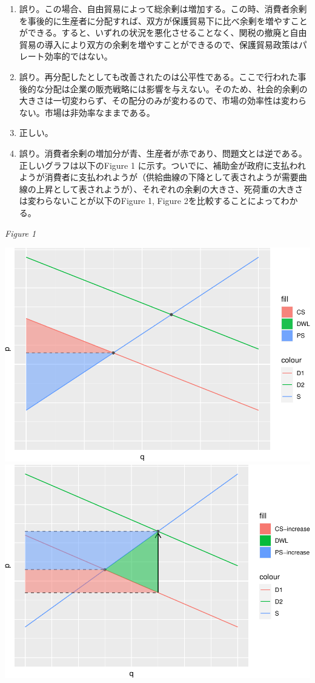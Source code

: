 \documentclass[
]{ltjarticle}
\begin{document}
\begin{enumerate}

\item 誤り。この場合、自由貿易によって総余剰は増加する。この時、消費者余剰を事後的に生産者に分配すれば、双方が保護貿易下に比べ余剰を増やすことができる。すると、いずれの状況を悪化させることなく、関税の撤廃と自由貿易の導入により双方の余剰を増やすことができるので、保護貿易政策はパレート効率的ではない。

\item 誤り。再分配したとしても改善されたのは公平性である。ここで行われた事後的な分配は企業の販売戦略には影響を与えない。そのため、社会的余剰の大きさは一切変わらず、その配分のみが変わるので、市場の効率性は変わらない。市場は非効率なままである。

\item 正しい。

\item 誤り。消費者余剰の増加分が青、生産者が赤であり、問題文とは逆である。正しいグラフは以下のFigure 1 に示す。ついでに、補助金が政府に支払われようが消費者に支払われようが（供給曲線の下降として表されようが需要曲線の上昇として表されようが）、それぞれの余剰の大きさ、死荷重の大きさは変わらないことが以下のFigure 1, Figure 2を比較することによってわかる。

\end{enumerate}
\begin{center} \textit{Figure 1} \end{center}

\includegraphics[width=0.5\linewidth]{group-report_files/figure-latex/version2-1}
\includegraphics[width=0.5\linewidth]{group-report_files/figure-latex/version2-2}
\end{document}
